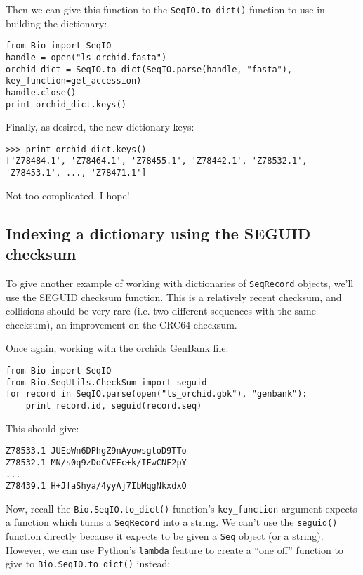\documentclass{report}
\begin{document}
\noindent Then we can give this function to the \verb|SeqIO.to_dict()| function to use in building the dictionary:

\begin{verbatim}
from Bio import SeqIO
handle = open("ls_orchid.fasta")
orchid_dict = SeqIO.to_dict(SeqIO.parse(handle, "fasta"), key_function=get_accession)
handle.close()
print orchid_dict.keys()
\end{verbatim}

\noindent Finally, as desired, the new dictionary keys:

\begin{verbatim}
>>> print orchid_dict.keys()
['Z78484.1', 'Z78464.1', 'Z78455.1', 'Z78442.1', 'Z78532.1', 'Z78453.1', ..., 'Z78471.1']
\end{verbatim}

\noindent Not too complicated, I hope!

\subsection{Indexing a dictionary using the SEGUID checksum}

To give another example of working with dictionaries of \verb|SeqRecord| objects, we'll use the SEGUID checksum function.  This is a relatively recent checksum, and collisions should be very rare (i.e. two different sequences with the same checksum), an improvement on the CRC64 checksum.

Once again, working with the orchids GenBank file:

\begin{verbatim}
from Bio import SeqIO
from Bio.SeqUtils.CheckSum import seguid
for record in SeqIO.parse(open("ls_orchid.gbk"), "genbank"):
    print record.id, seguid(record.seq)
\end{verbatim}

\noindent This should give:

\begin{verbatim}
Z78533.1 JUEoWn6DPhgZ9nAyowsgtoD9TTo
Z78532.1 MN/s0q9zDoCVEEc+k/IFwCNF2pY
...
Z78439.1 H+JfaShya/4yyAj7IbMqgNkxdxQ
\end{verbatim}

Now, recall the \verb|Bio.SeqIO.to_dict()| function's \verb|key_function| argument expects a function which turns a \verb|SeqRecord| into a string.  We can't use the \verb|seguid()| function directly because it expects to be given a \verb|Seq| object (or a string).  However, we can use Python's \verb|lambda| feature to create a ``one off'' function to give to \verb|Bio.SeqIO.to_dict()| instead:
\end{document}
